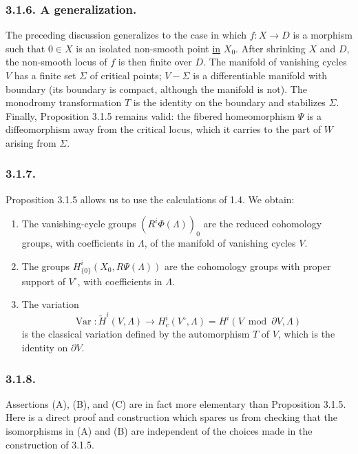 \subsubsection*{3.1.6. A generalization.}
The preceding discussion generalizes to the case in which
$f:X\to D$ is a morphism such that $0\in X$ is an isolated
non-smooth point \underline{in} $X_0$.  After shrinking $X$ and $D$,
the non-smooth locus of $f$ is then finite over $D$.  The manifold of
vanishing cycles $V$ has a finite set $\Sigma$ of critical points;
$V-\Sigma$ is a differentiable manifold with boundary (its boundary
is compact, although the manifold is not).  The monodromy
transformation $T$ is the identity on the boundary and stabilizes
$\Sigma$.  Finally, Proposition 3.1.5 remains valid: the fibered
homeomorphism $\Psi$ is a diffeomorphism away from the critical locus,
which it carries to the part of $W$ arising from $\Sigma$.

\subsubsection*{3.1.7.}
Proposition 3.1.5 allows us to use the calculations of 1.4.  We obtain:

\begin{enumerate}[label=(\Alph*)]
\item The vanishing-cycle groups $(R^i\Phi(\Lambda))_0$ are the
  reduced cohomology groups, with coefficients in $\Lambda$, of the
  manifold of vanishing cycles $V$.
\item The groups
  $H^i_{\{0\}}(X_0,R\Psi(\Lambda))$ are the cohomology groups with
  proper support of $V^\circ$, with coefficients in $\Lambda$.
\item The variation
  \[
  \operatorname{Var}:\widetilde H^i(V,\Lambda)
  \longrightarrow H_c^i(V^\circ,\Lambda)
  =H^i(V\bmod\partial V,\Lambda)
  \]
  is the classical variation defined by the automorphism $T$ of $V$,
  which is the identity on $\partial V$.
\end{enumerate}

\subsubsection*{3.1.8.}
Assertions (A), (B), and (C) are in fact more elementary than
Proposition 3.1.5.  Here is a direct proof and construction which
spares us from checking that the isomorphisms in (A) and (B) are
independent of the choices made in the construction of 3.1.5.

